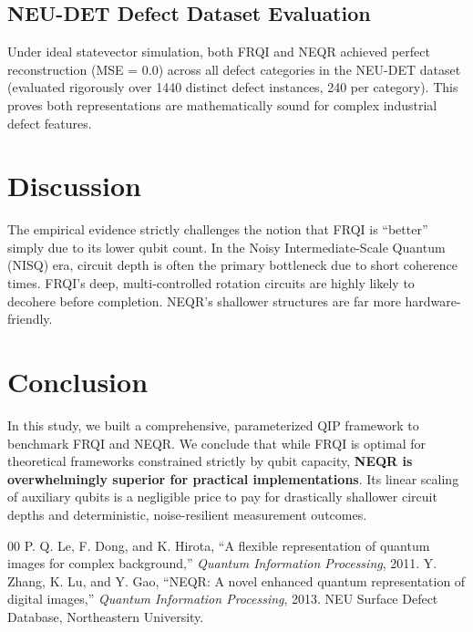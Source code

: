 \documentclass[conference]{IEEEtran}
\begin{document}
\subsection{NEU-DET Defect Dataset Evaluation}
Under ideal statevector simulation, both FRQI and NEQR achieved perfect reconstruction (MSE = 0.0) across all defect categories in the NEU-DET dataset (evaluated rigorously over 1440 distinct defect instances, 240 per category). This proves both representations are mathematically sound for complex industrial defect features.

\section{Discussion}
The empirical evidence strictly challenges the notion that FRQI is ``better'' simply due to its lower qubit count. In the Noisy Intermediate-Scale Quantum (NISQ) era, circuit depth is often the primary bottleneck due to short coherence times. FRQI's deep, multi-controlled rotation circuits are highly likely to decohere before completion. NEQR's shallower structures are far more hardware-friendly.

\section{Conclusion}
In this study, we built a comprehensive, parameterized QIP framework to benchmark FRQI and NEQR. We conclude that while FRQI is optimal for theoretical frameworks constrained strictly by qubit capacity, \textbf{NEQR is overwhelmingly superior for practical implementations}. Its linear scaling of auxiliary qubits is a negligible price to pay for drastically shallower circuit depths and deterministic, noise-resilient measurement outcomes. 

\begin{thebibliography}{00}
 P. Q. Le, F. Dong, and K. Hirota, ``A flexible representation of quantum images for complex background,'' \textit{Quantum Information Processing}, 2011.
 Y. Zhang, K. Lu, and Y. Gao, ``NEQR: A novel enhanced quantum representation of digital images,'' \textit{Quantum Information Processing}, 2013.
 NEU Surface Defect Database, Northeastern University.
\end{thebibliography}
\end{document}
